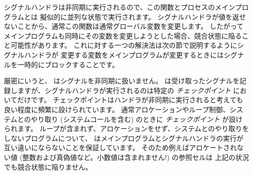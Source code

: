 シグナルハンドラは非同期に実行されるので、この関数とプロセスのメインプログラムとは
擬似的に並列な状態で実行されます。
シグナルハンドラが値を返せないことから、通常この関数は通常グローバル変数を変更します。
したがってメインプログラムも同時にその変数を変更しようとした場合、競合状態に陥ること可能性があります。
これに対する一つの解決法は次の節で説明するようにシグナルハンドラが
変更する変数をメインプログラムが変更するときにはシグナルを一時的にブロックすることです。

厳密にいうと、 \ocaml はシグナルを非同期に扱いません。
\ocaml は受け取ったシグナルを記録しますが、シグナルハンドラが実行されるのは特定の \emph{チェックポイント} においてだけです。
チェックポイントはハンドラが非同期に実行されると考えても良い程度に頻繁に設けられています。
通常アロケーションやループ制御、システムとのやり取り (システムコールを含む) のときに \emph{チェックポイント}
が設けられます。
ループが含まれず、アロケーションをせず、システムとのやり取りをしないプログラムについて、
\ocaml はメインプログラムとシグナルハンドラの実行が互い違いにならないことを保証しています。
そのため例えばアロケートされない値 (整数および真偽値など。小数値は含まれません!) の参照セルは
上記の状況でも競合状態に陥りません。

